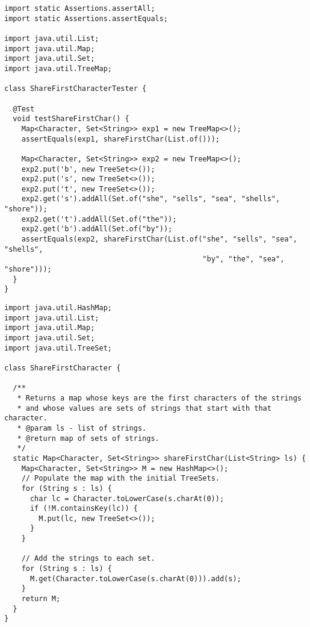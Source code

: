 \begin{cl}[]{}
\begin{lstlisting}[language=MyJava]
import static Assertions.assertAll;
import static Assertions.assertEquals;

import java.util.List;
import java.util.Map;
import java.util.Set;
import java.util.TreeMap;

class ShareFirstCharacterTester {
  
  @Test
  void testShareFirstChar() {
    Map<Character, Set<String>> exp1 = new TreeMap<>();
    assertEquals(exp1, shareFirstChar(List.of()));

    Map<Character, Set<String>> exp2 = new TreeMap<>();
    exp2.put('b', new TreeSet<>());
    exp2.put('s', new TreeSet<>());
    exp2.put('t', new TreeSet<>());
    exp2.get('s').addAll(Set.of("she", "sells", "sea", "shells", "shore"));
    exp2.get('t').addAll(Set.of("the"));
    exp2.get('b').addAll(Set.of("by"));
    assertEquals(exp2, shareFirstChar(List.of("she", "sells", "sea", "shells", 
                                              "by", "the", "sea", "shore")));
  }
}
\end{lstlisting}
\end{cl}

\begin{cl}[]{}
\begin{lstlisting}[language=MyJava]
import java.util.HashMap;
import java.util.List;
import java.util.Map;
import java.util.Set;
import java.util.TreeSet;

class ShareFirstCharacter {

  /**
   * Returns a map whose keys are the first characters of the strings
   * and whose values are sets of strings that start with that character.
   * @param ls - list of strings.
   * @return map of sets of strings.
   */
  static Map<Character, Set<String>> shareFirstChar(List<String> ls) {
    Map<Character, Set<String>> M = new HashMap<>();
    // Populate the map with the initial TreeSets.
    for (String s : ls) {
      char lc = Character.toLowerCase(s.charAt(0));
      if (!M.containsKey(lc)) {
        M.put(lc, new TreeSet<>());
      }
    }

    // Add the strings to each set.
    for (String s : ls) {
      M.get(Character.toLowerCase(s.charAt(0))).add(s);
    }
    return M;
  }
}
\end{lstlisting}
\end{cl}


